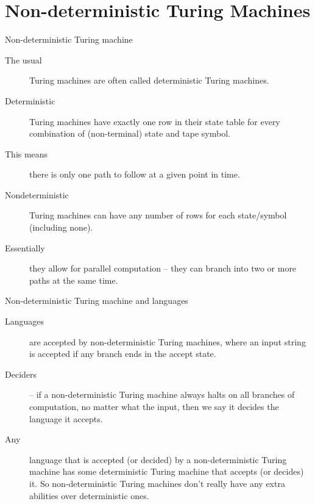 \documentclass{beamer}
\begin{document}
\section{Non-deterministic Turing Machines}

\begin{frame}{Non-deterministic Turing machine}
  \begin{description}
    \item[The usual] Turing machines are often called deterministic Turing machines.
    \item[Deterministic] Turing machines have exactly one row in their state table for every combination of (non-terminal) state and tape symbol.
    \item[This means] there is only one path to follow at a given point in time.
    \item[Nondeterministic] Turing machines can have any number of rows for each state/symbol (including none).
    \item[Essentially] they allow for parallel computation -- they can branch into two or more paths at the same time.
  \end{description}
\end{frame}


\begin{frame}{Non-deterministic Turing machine and languages}
  \begin{description}
    \item[Languages] are accepted by non-deterministic Turing machines, where an input string is accepted if any branch ends in the accept state.
    \item[Deciders] -- if a non-deterministic Turing machine always halts on all branches of computation, no matter what the input, then we say it decides the language it accepts.
    \item[Any] language that is accepted (or decided) by a non-deterministic Turing machine has some deterministic Turing machine that accepts (or decides) it. So non-deterministic Turing machines don't really have any extra abilities over deterministic ones.
  \end{description}
\end{frame}
\end{document}
